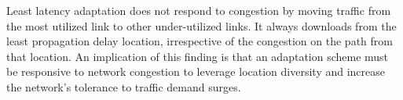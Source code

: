 

Least latency adaptation does not respond to congestion by moving traffic from the most utilized link to other under-utilized links.
It always downloads from the least propagation delay location, irrespective of the congestion on the path from that location.
An implication of this finding is that an adaptation scheme must be responsive to network congestion to leverage location diversity and increase the network's tolerance to traffic demand surges.






